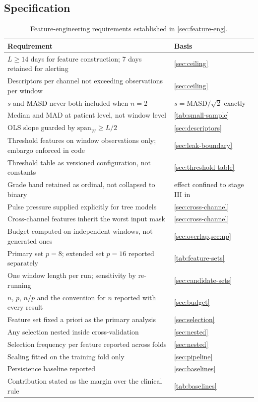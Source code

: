\documentclass[12pt,a4paper,oneside]{report}
\begin{document}
\subsection{Specification}\label{sec:spec33}

\begin{table}[htbp]
\centering\footnotesize
\caption{Feature-engineering requirements established in \cref{sec:feature-eng}.}\label{tab:spec33}
\begin{tabularx}{\textwidth}{@{}X >{\raggedright\arraybackslash}p{5.2cm}@{}}
\toprule
\textbf{Requirement} & \textbf{Basis} \\
\midrule
$L \geq 14$ days for feature construction; 7 days retained for alerting & \cref{sec:ceiling} \\
Descriptors per channel not exceeding observations per window & \cref{sec:ceiling} \\
$s$ and MASD never both included when $n = 2$ & $s = \mathrm{MASD}/\sqrt{2}$ exactly \\
Median and MAD at patient level, not window level & \cref{tab:small-sample} \\
OLS slope guarded by $\mathrm{span}_W \geq L/2$ & \cref{sec:descriptors} \\
Threshold features on window observations only; embargo enforced in code & \cref{sec:leak-boundary} \\
Threshold table as versioned configuration, not constants & \cref{sec:threshold-table} \\
Grade band retained as ordinal, not collapsed to binary & effect confined to stage III in \textcite{kingue2013} \\
Pulse pressure supplied explicitly for tree models & \cref{sec:cross-channel} \\
Cross-channel features inherit the worst input mask & \cref{sec:cross-channel} \\
Budget computed on independent windows, not generated ones & \cref{sec:overlap,sec:np} \\
Primary set $p = 8$; extended set $p = 16$ reported separately & \cref{tab:feature-sets} \\
One window length per run; sensitivity by re-running & \cref{sec:candidate-sets} \\
$n$, $p$, $n/p$ and the convention for $n$ reported with every result & \cref{sec:budget} \\
Feature set fixed a priori as the primary analysis & \cref{sec:selection} \\
Any selection nested inside cross-validation & \cref{sec:nested} \\
Selection frequency per feature reported across folds & \cref{sec:nested} \\
Scaling fitted on the training fold only & \cref{sec:pipeline} \\
Persistence baseline reported & \cref{sec:baselines} \\
Contribution stated as the margin over the clinical rule & \cref{tab:baselines} \\
\bottomrule
\end{tabularx}
\end{table}
\end{document}
